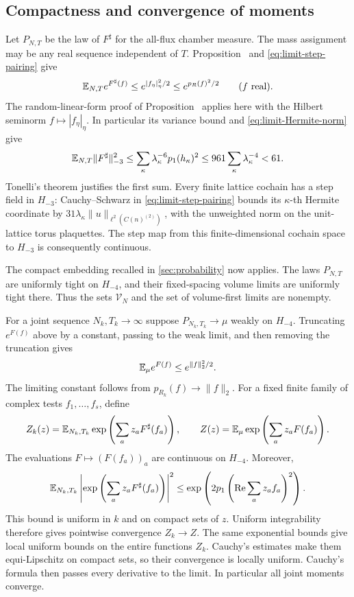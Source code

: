 \subsection{Compactness and convergence of moments}

Let $P_{N,T}$ be the law of $F^\sharp$ for the all-flux chamber
measure. The mass assignment may be any real sequence independent of
$T$. Proposition~ and
\eqref{eq:limit-step-pairing} give
\begin{equation}\label{eq:limit-cutoff-G}
 \mathbb E_{N,T}e^{F^\sharp(f)}
       \le e^{|f_\eta|_\eta^2/2}\le e^{p_R(f)^2/2}
       \qquad(f\text{ real}).
\end{equation}
The random-linear-form proof of Proposition~
applies here with the Hilbert seminorm $f\mapsto|f_\eta|_\eta$.
In particular its variance bound and \eqref{eq:limit-Hermite-norm}
give
\begin{equation}\label{eq:limit-uniform-tightness}
 \mathbb E_{N,T}\|F^\sharp\|_{-3}^2
 \le\sum_\kappa\lambda_\kappa^{-6}p_1(h_\kappa)^2
 \le961\sum_\kappa\lambda_\kappa^{-4}<61.
\end{equation}
Tonelli's theorem justifies the first sum. Every finite lattice
cochain has a step field in $H_{-3}$: Cauchy--Schwarz in
\eqref{eq:limit-step-pairing} bounds its $\kappa$-th Hermite
coordinate by $31\lambda_\kappa\|u\|_{\ell^2(C(n)^{(2)})}$,
with the unweighted norm on the unit-lattice torus plaquettes.
The step map from this finite-dimensional cochain space to $H_{-3}$
is consequently continuous.

The compact embedding recalled in \cref{sec:probability}
now applies. The laws $P_{N,T}$ are uniformly tight on $H_{-4}$,
and their fixed-spacing volume limits are uniformly tight there.
Thus the sets $\mathcal V_N$ and the set of volume-first limits
are nonempty.

For a joint sequence $N_k,T_k\to\infty$ suppose
$P_{N_k,T_k}\to\mu$ weakly on $H_{-4}$. Truncating $e^{F(f)}$
above by a constant, passing to the weak limit, and then removing
the truncation gives
\begin{equation}\label{eq:limit-continuum-G}
 \mathbb E_\mu e^{F(f)}\le e^{\|f\|_2^2/2}.
\end{equation}
The limiting constant follows from $p_{R_k}(f)\to\|f\|_2$.
For a fixed finite family of complex tests $f_1,\ldots,f_s$, define
\[
 Z_k(z)=\mathbb E_{N_k,T_k}\exp\left(\sum_a z_aF^\sharp(f_a)\right),
 \qquad
 Z(z)=\mathbb E_\mu\exp\left(\sum_a z_aF(f_a)\right).
\]
The evaluations $F\mapsto(F(f_a))_a$ are continuous on $H_{-4}$.
Moreover,
\[
 \mathbb E_{N_k,T_k}\left|\exp\left(\sum_a z_aF^\sharp(f_a)\right)\right|^2
 \le\exp\left(2p_1\left(\operatorname{Re}\sum_a z_af_a\right)^2\right).
\]
This bound is uniform in $k$ and on compact sets of $z$.
Uniform integrability therefore gives pointwise convergence
$Z_k\to Z$. The same exponential bounds give local uniform
bounds on the entire functions $Z_k$. Cauchy's estimates make them
equi-Lipschitz on compact sets, so their convergence is locally
uniform. Cauchy's formula then passes every derivative to the limit.
In particular all joint moments converge.

